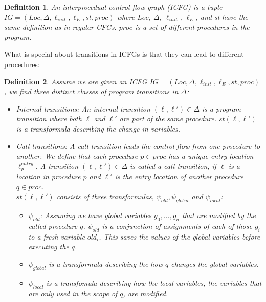 \documentclass{article}
\newtheorem{mydef}{Definition}
\begin{document}
	\begin{mydef}
		An interprocedual control flow graph (ICFG) is a tuple \\$IG = (Loc, \Delta, \ell_{init}, \ell_E, st, proc)$ where $Loc$, $\Delta$, $\ell_{init}$, $\ell_E$, and st have the same definition as in regular CFGs. $proc$ is a set of different procedures in the program. 
	\end{mydef}
	What is special about transitions in ICFGs is that they can lead to different procedures:
	\begin{mydef} Assume we are given an ICFG $IG = (Loc, \Delta, \ell_{init}, \ell_E, st, proc)$, we find three distinct classes of program transitions in $\Delta$:
		\begin{itemize}
			\item Internal transitions: An internal transition $(\ell, \ell') \in \Delta$ is a program transition where both $\ell$ and $\ell'$ are part of the same procedure. $st(\ell, \ell')$ is a transformula describing the change in variables.
			
			\item Call transitions:  A call transition leads the control flow from one procedure to another. We define that each procedure $p \in proc$ has a unique entry location $\ell^{entry}_p$. A transition $(\ell, \ell') \in \Delta$ is called a call transition, if $\ell$ is a location in procedure $p$ and $\ell'$ is the entry location of another procedure $q \in proc$. \\ $st(\ell, \ell')$ consists of three transformulas, $\psi_{old}, \psi_{global}$ and $\psi_{local}$: 
			\begin{itemize}
				\item$\psi_{old}$: Assuming we have global variables $g_0, ..., g_n$ that are modified by the called procedure $q$. $\psi_{old}$ is a conjunction of assignments of each of those $g_i$ to a fresh variable $old_{i}$. This saves the values of the global variables before executing the $q$. 
				\item $\psi_{global}$ is a transformula describing the how $q$ changes the global variables.
				\item $\psi_{local}$ is a transfomula describing how the local variables, the variables that are only used in the scope of $q$, are modified.
			\end{itemize}
			

\end{itemize}
\end{mydef}
\end{document}
